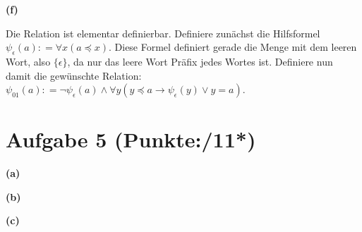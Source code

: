 \documentclass[11pt, a4paper]{article}
\newcommand{\pppp}{11*}
\newcommand{\defgr}{\mathrel{\mathop:\!\!=}}
\begin{document}
\textbf{(f)}
\begin{adjustwidth}{20pt}{20pt}
	Die Relation ist elementar definierbar. Definiere zunächst die Hilfsformel $\psi_\epsilon(a) \defgr \forall x(a \preceq x)$. Diese Formel definiert gerade die Menge mit dem leeren Wort, also
	$\{\epsilon\}$, da nur das leere Wort Präfix jedes Wortes ist. Definiere nun damit die gewünschte Relation:\\
	$\psi_{01}(a) \defgr \neg\psi_\epsilon(a) \wedge \forall y(y \preceq a \rightarrow \psi_\epsilon(y) \vee y=a)$.
\end{adjustwidth}


\section*{Aufgabe 5 (Punkte:\qquad/\pppp)}
\textbf{(a)}
\begin{adjustwidth}{20pt}{20pt}
\end{adjustwidth}
\textbf{(b)}
\begin{adjustwidth}{20pt}{20pt}

\end{adjustwidth}
\textbf{(c)}
\begin{adjustwidth}{20pt}{20pt}

\end{adjustwidth}
\end{document}
